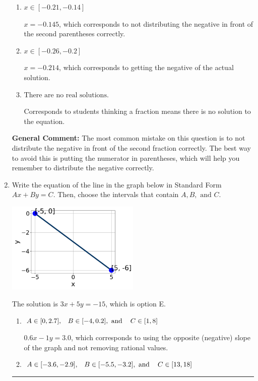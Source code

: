 \documentclass{extbook}[14pt]
\newcommand{\litem}[1]{\item #1

\rule{\textwidth}{0.4pt}}
\begin{document}
\begin{enumerate}
{\begin{enumerate}[label=\Alph*.]
$x = 0.145$, which corresponds to not distributing the negative in front of the first parentheses correctly.
\item \( x \in [-0.21, -0.14] \)

$x = -0.145$, which corresponds to not distributing the negative in front of the second parentheses correctly.
\item \( x \in [-0.26, -0.2] \)

$x = -0.214$, which corresponds to getting the negative of the actual solution.
\item \( \text{There are no real solutions.} \)

Corresponds to students thinking a fraction means there is no solution to the equation.
\end{enumerate}

\textbf{General Comment:} The most common mistake on this question is to not distribute the negative in front of the second fraction correctly. The best way to avoid this is putting the numerator in parentheses, which will help you remember to distribute the negative correctly.
}
\litem{
Write the equation of the line in the graph below in Standard Form $Ax+By=C$. Then, choose the intervals that contain $A, B, \text{ and } C$.

\begin{center}
    \includegraphics[width=0.5\textwidth]{../Figures/linearGraphToStandardCopyC.png}
\end{center}


The solution is \( 3x + 5y = -15 \), which is option E.\begin{enumerate}[label=\Alph*.]
\item \( A \in [0, 2.7], \hspace{3mm} B \in [-4, 0.2], \text{ and } \hspace{3mm} C \in [1, 8] \)

 $0.6x - 1y = 3.0$, which corresponds to using the opposite (negative) slope of the graph and not removing rational values.
\item \( A \in [-3.6, -2.9], \hspace{3mm} B \in [-5.5, -3.2], \text{ and } \hspace{3mm} C \in [13, 18] \)


\end{enumerate}}
\end{enumerate}
\end{document}
